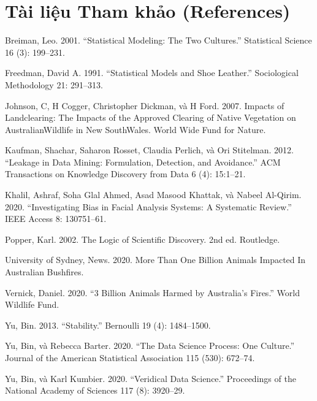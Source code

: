 \section*{Tài liệu Tham khảo (References)}

Breiman, Leo. 2001. “Statistical Modeling: The Two Cultures.” Statistical Science 16 (3): 199–231.

Freedman, David A. 1991. “Statistical Models and Shoe Leather.” Sociological Methodology 21: 291–313.

Johnson, C, H Cogger, Christopher Dickman, và H Ford. 2007. Impacts of Landclearing: The Impacts of the Approved Clearing of Native Vegetation on AustralianWildlife in New SouthWales. World Wide Fund for Nature.

Kaufman, Shachar, Saharon Rosset, Claudia Perlich, và Ori Stitelman. 2012. “Leakage in Data Mining: Formulation, Detection, and Avoidance.” ACM Transactions on Knowledge Discovery from Data 6 (4): 15:1–21.

Khalil, Ashraf, Soha Glal Ahmed, Asad Masood Khattak, và Nabeel Al-Qirim. 2020. “Investigating Bias in Facial Analysis Systems: A Systematic Review.” IEEE Access 8: 130751–61.

Popper, Karl. 2002. The Logic of Scientific Discovery. 2nd ed. Routledge.

University of Sydney, News. 2020. More Than One Billion Animals Impacted In Australian Bushfires.

Vernick, Daniel. 2020. “3 Billion Animals Harmed by Australia’s Fires.” World Wildlife Fund.

Yu, Bin. 2013. “Stability.” Bernoulli 19 (4): 1484–1500.

Yu, Bin, và Rebecca Barter. 2020. “The Data Science Process: One Culture.” Journal of the American Statistical Association 115 (530): 672–74.

Yu, Bin, và Karl Kumbier. 2020. “Veridical Data Science.” Proceedings of the National Academy of Sciences 117 (8): 3920–29.

